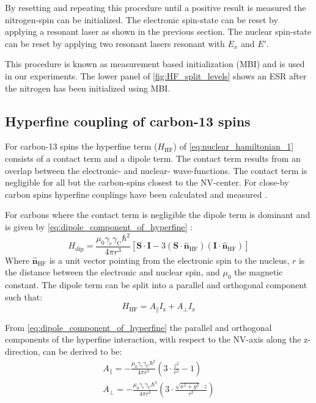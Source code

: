By resetting and repeating this procedure until a positive result is measured the nitrogen-spin can be initialized.
The electronic spin-state can be reset by applying a resonant laser as shown in the previous section.
The nuclear spin-state can be reset by applying two resonant lasers resonant with $E_x$ and $E'$.

This procedure is known as measurement based initialization (MBI) and is used in our experiments.
The lower panel of \cref{fig:HF_split_levels} shows an ESR after the nitrogen has been initialized using MBI.

\subsection{Hyperfine coupling of carbon-13 spins}
For carbon-13 spins the hyperfine term ($H_{\mathrm{HF}}$) of \cref{eq:nuclear_hamiltonian_1} consists of a contact term and a dipole term.
The contact term results from an overlap between the electronic- and nuclear- wave-functions.
The contact term is negligible for all but the carbon-spins closest to the NV-center.
For close-by carbon spins hyperfine couplings have been  calculated \citep{Gali2008Ab,Gali2009Identification} and measured \citep{Smeltzer201113}.

For carbons where the contact term is negligible the dipole term is dominant and is given by \cref{eq:dipole_component_of_hyperfine} \citep{Lange2012Quantum}:
\begin{equation}
\label{eq:dipole_component_of_hyperfine}
H_{\mathrm{dip}} = \frac{\mu_0 \gamma_e \gamma_{\mathrm{C}} \hbar^2 }{4 \pi r^3} [ \bm{S \cdot I} - 3 (\bm S \cdot \hat{\bm{n}}_{\mathrm{HF}})(\bm I \cdot \hat{\bm{n}}_{\mathrm{HF}})]
\end{equation}
Where $\hat{\bm{n}}_{\mathrm{HF}}$ is a unit vector pointing from the electronic spin to the nucleus, $r$ is the distance between the electronic and nuclear spin, and $\mu_0$ the magnetic constant.
The dipole term can be split into a parallel and orthogonal component such that:
\begin{equation}
     H_{\mathrm{HF}} = A_\parallel I_\mathrm{z} + A_\perp I_x
 \end{equation}


From \cref{eq:dipole_component_of_hyperfine}  the parallel and orthogonal components of the hyperfine interaction, with respect to the NV-axis along the z-direction, can be derived to be:
 \begin{align}
A_\parallel= - \frac{\mu_0 \gamma_e \gamma_{\mathrm{C}} \hbar^2 }{4 \pi r^3} \left(3\cdot \frac{z^2}{r^2}-1\right)\\
 A_\perp =  -\frac{\mu_0 \gamma_e \gamma_{\mathrm{C}} \hbar^2 }{4 \pi r^3}\left( 3\cdot\frac{\sqrt{x^2+y^2}\cdot z}{r^2}\right)
\end{align}


